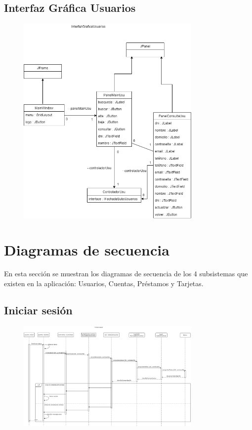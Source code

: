 \documentclass[12pt]{article}
\begin{document}
\subsection{Interfaz Gráfica Usuarios}
\begin{figure}[H]
    \centering
    \includegraphics[width=0.8\textwidth]{images/InterfazGraficaUsuarios1.png}
\end{figure}

\newpage
\section{Diagramas de secuencia} %
En esta sección se muestran los diagramas de secuencia de los 4 subsistemas que existen en la aplicación: Usuarios, Cuentas, Préstamos y Tarjetas.
\subsection{Iniciar sesión}
\begin{figure}[H]
    \centering
    \includegraphics[width=0.8\textwidth]{images/iniciar_sesion.png}
\end{figure}
\end{document}

